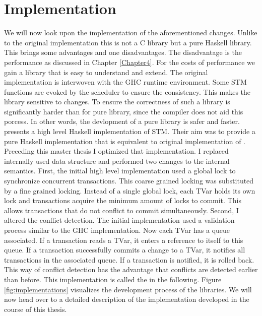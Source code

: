 
\chapter{Implementation} %

\label{Chapter3}

We will now look upon the implementation of the aforementioned changes. Unlike to the original
implementation this is not a C library but a pure Haskell library. This brings some advantages 
and one disadvantages. The disadvantage is the performance as discussed in Chapter \ref{Chapter4}.
For the costs of performance we gain a library that is easy to understand and extend. The original 
implementation is interwoven with the GHC runtime environment. Some STM functions are evoked by 
the scheduler to ensure the consistency. This makes the library sensitive to changes. 
To ensure the correctness of such a library is significantly harder than for pure library, since
the compiler does not aid this porcess. In other words, the devlopment of a pure library is safer
and faster. \parencite{STMHigh} presents a high level Haskell implementation of STM. Their aim
was to provide a pure Haskell implementation that is equivalent to original implementation of 
\parencite{STMBase}. Preceding this master thesis I optimized that implementation. I replaced
internally used data structure and performed two changes to the internal semantics. First, 
the initial high level implementation used a global lock to synchronize concurrent transactions.
This coarse grained locking was substituted by a fine grained locking. Instead of a single
global lock, each TVar holds its own lock and transactions acquire the minimum amount of 
locks to commit. This allows transactions that do not conflict to commit simultaneously.
Second, I altered the conflict detection. The initial implementation used a validation process
similar to the GHC implementation. Now each TVar has a queue associated. If a transaction reads 
a TVar, it enters a reference to itself to this queue. If a transaction successfully commits a change to a TVar, it 
notifies all transactions in the associated queue. If a transaction is notified, it is rolled back.
This way of conflict detection has the advantage that conflicts are detected earlier than before.
This implementation is called the  in the following. Figure 
\ref{fig:implementations} visualizes the development process of the libraries.
We will now head over to a detailed description of the implementation developed in the course of this 
thesis. 

